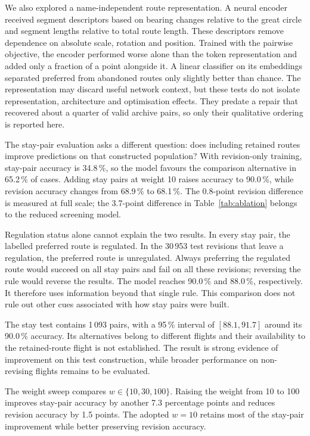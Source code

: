 \documentclass[preprint,authoryear,12pt]{elsarticle}
\begin{document}
We also explored a name-independent route representation. A neural
encoder received segment descriptors based on bearing changes relative
to the great circle and segment lengths relative to total route length.
These descriptors remove dependence on absolute scale, rotation and
position. Trained with the pairwise objective, the encoder performed
worse alone than the token representation and added only a fraction
of a point alongside it. A linear classifier on its embeddings separated
preferred from abandoned routes only slightly better than chance.
The representation may discard useful network context, but these tests
do not isolate representation, architecture and optimisation effects.
They predate a repair that recovered about a quarter of valid archive
pairs, so only their qualitative ordering is reported here.

The stay-pair evaluation asks a different question: does including
retained routes improve predictions on that constructed population?
With revision-only training, stay-pair accuracy is 34.8\,\%, so the
model favours the comparison alternative in 65.2\,\% of cases.
Adding stay pairs at weight 10 raises accuracy to 90.0\,\%, while
revision accuracy changes from 68.9\,\% to 68.1\,\%. The 0.8-point
revision difference is measured at full scale; the 3.7-point difference
in Table~\ref{tab:ablation} belongs to the reduced screening model.

Regulation status alone cannot explain the two results. In every stay
pair, the labelled preferred route is regulated. In the 30\,953 test
revisions that leave a regulation, the preferred route is unregulated.
Always preferring the regulated route would succeed on all stay pairs
and fail on all these revisions; reversing the rule would reverse the
results. The model reaches 90.0\,\% and 88.0\,\%, respectively.
It therefore uses information beyond that single rule. This comparison
does not rule out other cues associated with how stay pairs were built.

The stay test contains 1\,093 pairs, with a 95\,\% interval of
$[88.1,91.7]$ around its 90.0\,\% accuracy. Its alternatives belong
to different flights and their availability to the retained-route
flight is not established. The result is strong evidence of improvement
on this test construction, while broader performance on non-revising
flights remains to be evaluated.

The weight sweep compares $w\in\{10,30,100\}$. Raising the weight
from 10 to 100 improves stay-pair accuracy by another 7.3 percentage
points and reduces revision accuracy by 1.5 points. The adopted $w=10$ retains most of the stay-pair improvement
while better preserving revision accuracy.
\end{document}
